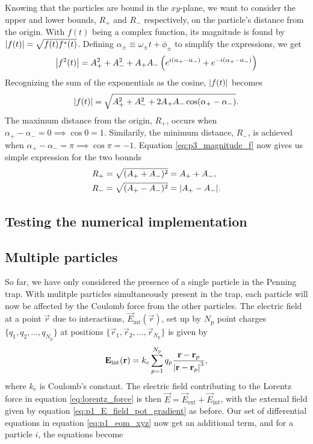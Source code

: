 Knowing that the particles are bound in the $xy$-plane, we want to consider the upper and lower bounds, $R_+$ and $R_-$ respectively, on the particle's distance from the origin. With $f(t)$ being a complex function, its magnitude is found by $\abs{f(t)}=\sqrt{f(t)f^*(t)}$. Defining $\alpha_\pm \equiv \omega_\pm t + \phi_\pm$ to simplify the expressions, we get 
\begin{equation}\label{eq:p3_magnitude_f_squared}
        \abs{f^2(t)} = A_+^2 + A_-^2 + A_+ A_- \left( e^{i(\alpha_+ - \alpha_-)} + e^{-i(\alpha_+ - \alpha_-)} \right)
\end{equation}
Recognizing the sum of the exponentials as the cosine, $\abs{f(t)}$ becomes 
\begin{equation}\label{eq:p3_magnitude_f}
    \abs{f(t)} = \sqrt{A_+^2 + A_-^2 + 2A_+ A_-\cos(\alpha_+ - \alpha_-)}.
\end{equation}
The maximum distance from the origin, $R_+$, occurs when $\alpha_+-\alpha_- = 0 \implies \cos0=1$. Similarily, the minimum distance, $R_-$, is achieved when $\alpha_+-\alpha_- = \pi \implies \cos\pi=-1$. Equation \eqref{eq:p3_magnitude_f} now gives us simple expression for the two bounds  
\begin{align}
    R_+ &= \sqrt{(A_+ + A_-)^2} = A_+ + A_-, \label{eq:p4_Rplus} \\
    R_- &= \sqrt{(A_+ - A_-)^2} = \abs{A_+ - A_-}. \label{eq:p4_Rminus}  
\end{align}


\subsection{Testing the numerical implementation}\label{subsec_methods:testing_single_particle}

\subsection{Multiple particles}\label{subsec_methods:multiple_particles}
So far, we have only considered the presence of a single particle in the Penning trap. With mulitple particles simultaneously present in the trap, each particle will now be affected by the Coulomb force from the other particles. The electric field at a point $\vec{r}$ due to interactions, $\vec{E}_\mathrm{int}(\vec{r})$, set up by $N_\mathrm{p}$ point charges $\{q_1, q_2, \dots, q_{N_\mathrm{p}}\}$ at positions $\{\vec{r}_1, \vec{r}_2, \dots, \vec{r}_{N_\mathrm{p}}\}$ is given by
\begin{equation}\label{eq:interaction_field}
    \mathbf{E}_\mathrm{int} (\mathbf{r}) = k_e \sum_{p=1}^{N_\mathrm{p}} q_p \frac{\mathbf{r}-\mathbf{r}_p}{\abs{\mathbf{r}-\mathbf{r}_p}^3},
\end{equation}
where $k_e$ is Coulomb's constant. The electric field contributing to the Lorentz force in equation \eqref{eq:lorentz_force} is then $\vec{E} = \vec{E}_\mathrm{ext} + \vec{E}_\mathrm{int}$, with the external field given by equation \eqref{eq:p1_E_field_pot_gradient} as before. Our set of differential equations in equation \eqref{eq:p1_eom_xyz} now get an additional term, and for a particle $i$, the equations become 

